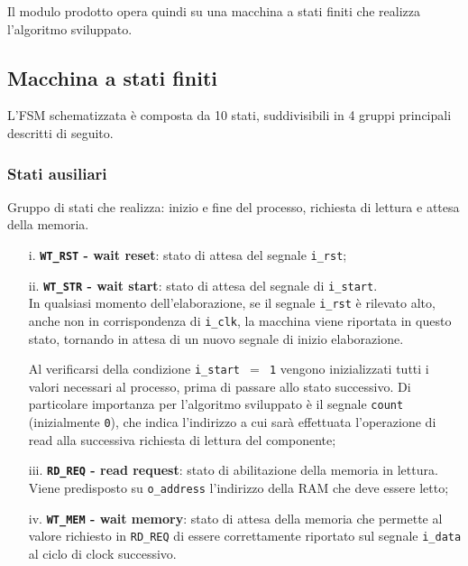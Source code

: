 \documentclass{article}
\begin{document}
Il modulo prodotto opera quindi su una macchina a stati finiti che realizza l'algoritmo sviluppato.
\vspace{0,2cm}

\subsection{Macchina a stati finiti} %
L’FSM schematizzata è composta da 10 stati, suddivisibili in 4 gruppi principali descritti di seguito.

\subsubsection{Stati ausiliari} %
Gruppo di stati che realizza: inizio e fine del processo, richiesta di lettura e attesa della memoria.
\begin{itemize}
    \item [i.]      \textbf{\texttt{WT\_RST} - wait reset}: stato di attesa del segnale \texttt{i\_rst};
    \item [ii.]     \textbf{\texttt{WT\_STR} - wait start}: stato di attesa del segnale di \texttt{i\_start}. \\
          In qualsiasi momento dell’elaborazione, se il segnale \texttt{i\_rst} è rilevato alto\footnotemark, anche non in corrispondenza di \texttt{i\_clk}, la macchina viene riportata in questo stato, tornando in attesa di un nuovo segnale di inizio elaborazione.\par
          Al verificarsi della condizione \texttt{i\_start $=$ 1} vengono inizializzati tutti i valori necessari al processo, prima di passare allo stato successivo. Di particolare importanza per l’algoritmo sviluppato è il segnale \texttt{count} (inizialmente \texttt{0}), che indica l’indirizzo a cui sarà effettuata l’operazione di read alla successiva richiesta di lettura del componente;
    \item [iii.]    \textbf{\texttt{RD\_REQ} - read request}: stato di abilitazione della memoria in lettura. Viene predisposto su \texttt{o\_address} l’indirizzo della RAM che deve essere letto;
    \item [iv.]     \textbf{\texttt{WT\_MEM} - wait memory}: stato di attesa della memoria che permette al valore richiesto in \texttt{RD\_REQ} di essere correttamente riportato sul segnale \texttt{i\_data} al ciclo di clock successivo. \par

\end{itemize}
\end{document}
